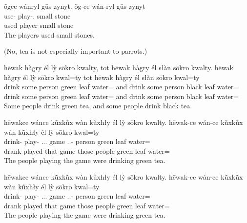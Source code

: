 \documentclass[12pt]{article}
\begin{document}
    \begin{exe}
        \ex
        õgce wánryl gūs zynyt.
        \glll
        õg-ce wán-ryl gūs zynyt \\
        use-\Pst{} play-\Agt{}.\Anim{} small stone \\
        used player small stone \\
        \glt
        The players used small stones.
    \end{exe}

    (No, tea is not especially important to parrots.)
    \begin{exe}
        \ex
        hēwak hàgry él lỳ sōkro kwalty, tot hēwak hàgry él słàn sōkro kwalty.
        \glll
        hēwak hàgry él lỳ sōkro kwal=ty tot hēwak hàgry él słàn sōkro kwal=ty \\
        drink some person green leaf water=\Poss{} and drink some person black leaf water=\Poss{} \\
        drink some person green leaf water=\Poss{} and drink some person black leaf water=\Poss{} \\
        \glt
        Some people drink green tea, and some people drink black tea.
    \end{exe}

    \begin{exe}
        \ex
        hēwakce wánce kũxkũx wàn kũxhły él lỳ sōkro kwalty.
        \glll
        hēwak-ce wán-ce kũxkũx wàn kũxhły él lỳ sōkro kwal=ty \\
        drink-\Pst{} play-\Pst{} \Dem{}.\Anim{}.\Dist{}.\Pl{} game \Dem{}.\Anim{}.\Dist{}-\Adj{} person green leaf water=\Poss{} \\
        drank played that game those people green leaf water=\Poss{} \\
        \glt
        The people playing the game were drinking green tea.
    \end{exe}

    \begin{exe}
        \ex
        hēwakce wánce kũxkũx wàn kũxhły él lỳ sōkro kwalty.
        \glll
        hēwak-ce wán-ce kũxkũx wàn kũxhły él lỳ sōkro kwal=ty \\
        drink-\Pst{} play-\Pst{} \Dem{}.\Anim{}.\Dist{}.\Pl{} game \Dem{}.\Anim{}.\Dist{}-\Adj{} person green leaf water=\Poss{} \\
        drank played that game those people green leaf water=\Poss{} \\
        \glt
        The people playing the game were drinking green tea.
    \end{exe}
\end{document}
